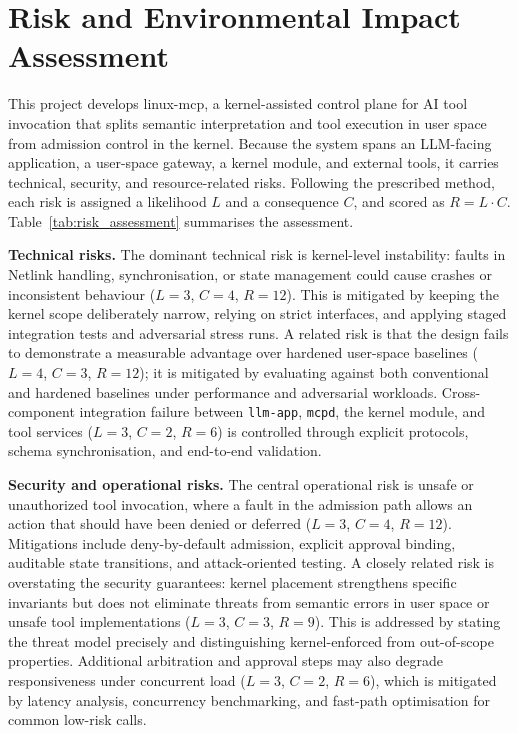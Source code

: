 \section*{Risk and Environmental Impact Assessment}
\setcounter{section}{6} \setcounter{subsection}{0}
 {}


This project develops linux-mcp, a kernel-assisted control plane for AI tool invocation that splits semantic interpretation and tool execution in user space from admission control in the kernel.
Because the system spans an LLM-facing application, a user-space gateway, a kernel module, and external tools, it carries technical, security, and resource-related risks.
Following the prescribed method, each risk is assigned a likelihood $L$ and a consequence $C$, and scored as $R = L \cdot C$.
Table~\ref{tab:risk_assessment} summarises the assessment.

\textbf{Technical risks.}
The dominant technical risk is kernel-level instability: faults in Netlink handling, synchronisation, or state management could cause crashes or inconsistent behaviour ($L=3$, $C=4$, $R=12$).
This is mitigated by keeping the kernel scope deliberately narrow, relying on strict interfaces, and applying staged integration tests and adversarial stress runs.
A related risk is that the design fails to demonstrate a measurable advantage over hardened user-space baselines ($L=4$, $C=3$, $R=12$); it is mitigated by evaluating against both conventional and hardened baselines under performance and adversarial workloads.
Cross-component integration failure between \texttt{llm-app}, \texttt{mcpd}, the kernel module, and tool services ($L=3$, $C=2$, $R=6$) is controlled through explicit protocols, schema synchronisation, and end-to-end validation.

\textbf{Security and operational risks.}
The central operational risk is unsafe or unauthorized tool invocation, where a fault in the admission path allows an action that should have been denied or deferred ($L=3$, $C=4$, $R=12$).
Mitigations include deny-by-default admission, explicit approval binding, auditable state transitions, and attack-oriented testing.
A closely related risk is overstating the security guarantees: kernel placement strengthens specific invariants but does not eliminate threats from semantic errors in user space or unsafe tool implementations ($L=3$, $C=3$, $R=9$).
This is addressed by stating the threat model precisely and distinguishing kernel-enforced from out-of-scope properties.
Additional arbitration and approval steps may also degrade responsiveness under concurrent load ($L=3$, $C=2$, $R=6$), which is mitigated by latency analysis, concurrency benchmarking, and fast-path optimisation for common low-risk calls.

